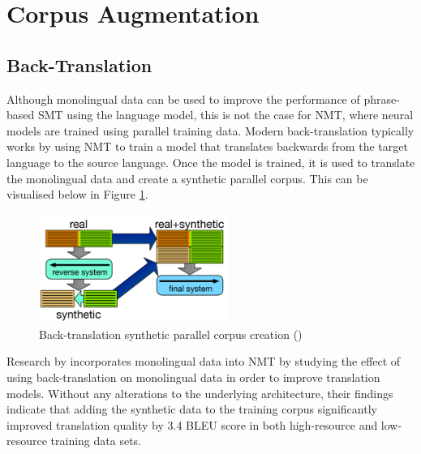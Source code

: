 
\clearpage

\section{Corpus Augmentation}

\subsection{Back-Translation}
Although monolingual data can be used to improve the performance of phrase-based \acrfull{SMT} using the language model, this is not the case for \acrshort{NMT}, where neural models are trained using parallel training data. Modern back-translation typically works by using \acrshort{NMT} to train a model that translates backwards from the target language to the source language. Once the model is trained, it is used to translate the monolingual data and create a synthetic parallel corpus. This can be visualised below in Figure \ref{fig:back_trans}.

\begin{figure}[ht!]
\centering
\includegraphics[width=0.55\textwidth]{media/literature/data_argumentation/da_back_trans.png}
\caption[Diagram of the back-translation synthetic parallel corpus]{Back-translation synthetic parallel corpus creation (\cite{hoang_iterative_2018})}
\label{fig:back_trans}
\end{figure}
Research by \cite{sennrich_improving_2016} incorporates monolingual data into \acrshort{NMT} by studying the effect of using back-translation on monolingual data in order to improve translation models.  Without any alterations to the underlying architecture, their findings indicate that adding the synthetic data to the training corpus significantly improved translation quality by 3.4 BLEU score in both high-resource and low-resource training data sets.



